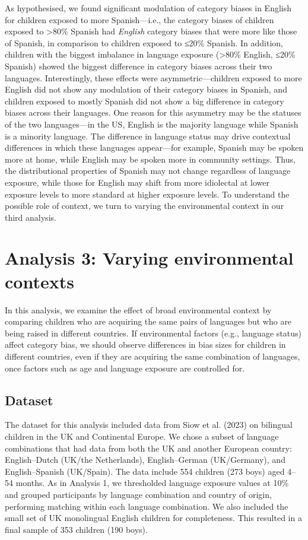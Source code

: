 \documentclass[10pt, letterpaper]{article}
\begin{document}
As hypothesised, we found significant modulation of category biases in
English for children exposed to more Spanish---i.e., the category biases
of children exposed to \textgreater80\% Spanish had \emph{English}
category biases that were more like those of Spanish, in comparison to
children exposed to ≤20\% Spanish. In addition, children with the
biggest imbalance in language exposure (\textgreater80\% English, ≤20\%
Spanish) showed the biggest difference in category biases across their
two languages. Interestingly, these effects were asymmetric---children
exposed to more English did not show any modulation of their category
biases in Spanish, and children exposed to mostly Spanish did not show a
big difference in category biases across their languages. One reason for
this asymmetry may be the statuses of the two languages---in the US,
English is the majority language while Spanish is a minority language.
The difference in language status may drive contextual differences in
which these languages appear---for example, Spanish may be spoken more
at home, while English may be spoken more in community settings. Thus,
the distributional properties of Spanish may not change regardless of
language exposure, while those for English may shift from more
idiolectal at lower exposure levels to more standard at higher exposure
levels. To understand the possible role of context, we turn to varying
the environmental context in our third analysis.

\section{Analysis 3: Varying environmental
contexts}\label{analysis-3-varying-environmental-contexts}

In this analysis, we examine the effect of broad environmental context
by comparing children who are acquiring the same pairs of languages but
who are being raised in different countries. If environmental factors
(e.g., language status) affect category bias, we should observe
differences in bias sizes for children in different countries, even if
they are acquiring the same combination of languages, once factors such
as age and language exposure are controlled for.

\subsection{Dataset}\label{dataset-2}

The dataset for this analysis included data from Siow et al. (2023) on
bilingual children in the UK and Continental Europe. We chose a subset
of language combinations that had data from both the UK and another
European country: English--Dutch (UK/the Netherlands), English--German
(UK/Germany), and English--Spanish (UK/Spain). The data include 554
children (273 boys) aged 4--54 months. As in Analysis 1, we thresholded
language exposure values at 10\% and grouped participants by language
combination and country of origin, performing matching within each
language combination. We also included the small set of UK monolingual
English children for completeness. This resulted in a final sample of
353 children (190 boys).
\end{document}
